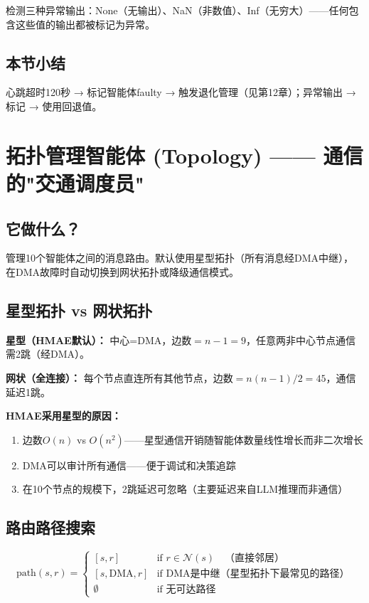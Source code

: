 \documentclass[11pt,a4paper]{ctexart}
\begin{document}
检测三种异常输出：None（无输出）、NaN（非数值）、Inf（无穷大）——任何包含这些值的输出都被标记为异常。

\subsection{本节小结}

心跳超时120秒 → 标记智能体faulty → 触发退化管理（见第12章）；异常输出 → 标记 → 使用回退值。

\newpage

\section{拓扑管理智能体 (Topology) —— 通信的"交通调度员"}

\subsection{它做什么？}

管理10个智能体之间的消息路由。默认使用星型拓扑（所有消息经DMA中继），
在DMA故障时自动切换到网状拓扑或降级通信模式。

\subsection{星型拓扑 vs 网状拓扑}

\textbf{星型（HMAE默认）：} 中心=DMA，边数$=n-1=9$，任意两非中心节点通信需2跳（经DMA）。

\textbf{网状（全连接）：} 每个节点直连所有其他节点，边数$=n(n-1)/2=45$，通信延迟1跳。

\textbf{HMAE采用星型的原因：}
\begin{enumerate}[nosep]
\item 边数$O(n)$ vs $O(n^2)$——星型通信开销随智能体数量线性增长而非二次增长
\item DMA可以审计所有通信——便于调试和决策追踪
\item 在10个节点的规模下，2跳延迟可忽略（主要延迟来自LLM推理而非通信）
\end{enumerate}

\subsection{路由路径搜索}

$$\text{path}(s, r) = \begin{cases}
[s, r] & \text{if } r \in \mathcal{N}(s) \quad \text{（直接邻居）}\\
[s, \text{DMA}, r] & \text{if DMA是中继（星型拓扑下最常见的路径）}\\
\emptyset & \text{if 无可达路径}
\end{cases}$$
\end{document}
